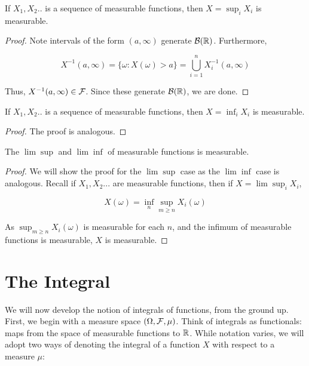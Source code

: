 \begin{theorem}
    If $X_1,X_2..$ is a sequence of measurable functions, then 
    $X = \sup_i X_i$ is measurable.
\end{theorem}

\begin{proof}
    Note intervals of the form $(a,\infty)$ generate $\mathcal B(\mathbb R)$. Furthermore, 

    \[ X^{-1}(a,\infty) = \{ \omega : X(\omega) > a \}  = \bigcup_{i=1}^n X_i^{-1}(a,\infty) \]

    Thus, $X^{-1}(a,\infty) \in \mathcal F$. Since these generate $\mathcal B(\mathbb R)$, we are done.
\end{proof}

\begin{theorem}
    If $X_1,X_2..$ is a sequence of measurable functions, then 
    $X = \inf_i X_i$ is measurable.
\end{theorem}

\begin{proof}
    The proof is analogous.
\end{proof}

\begin{Proposition}
    The $\lim\sup$ and $\lim\inf$ of measurable functions is measurable. 
\end{Proposition}

\begin{proof}
    We will show the proof for the $\lim\sup$ case as the $\lim\inf$ case is analogous. 
    Recall if $X_1,X_2...$ are measurable functions, then if $X = \lim\sup_i X_i$,

    \[ X(\omega) = \inf_n \sup_{m \geq n} X_i(\omega) \]

    As $\sup_{m \geq n} X_i(\omega)$ is measurable for each $n$, and the infimum of 
    measurable functions is measurable, $X$ is measurable.
\end{proof}

\section{The Integral}

We will now develop the notion of integrals of functions, from the ground up. 
First, we begin with a measure space $(\Omega, \mathcal F, \mu)$. Think of integrals as functionals: 
maps from the space of measurable functions to $\mathbb R$. While notation varies, we will 
adopt two ways of denoting the integral of a function $X$ with respect to a measure 
$\mu$:

